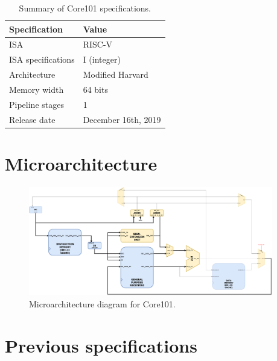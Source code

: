 \documentclass{article}
\begin{document}
\begin{table}[h]
    \centering
    \begin{tabular}{|l|l|}
        \hline
        \textbf{Specification}  &   \textbf{Value}      \\  \hline
        ISA                     &   RISC-V              \\  \hline
        ISA specifications      &   I (integer)         \\  \hline
        Architecture            &   Modified Harvard    \\  \hline
        Memory width            &   64 bits             \\  \hline
        Pipeline stages         &   1                   \\  \hline
        Release date            &   December 16th, 2019 \\  \hline
        
    \end{tabular}
    \caption{Summary of Core101 specifications.}
    \label{tab:specs0}
\end{table}

\section{Microarchitecture}

\begin{figure}[h]
    \centering
    \includegraphics[width=0.95\textwidth]{resources/core101.pdf}
    \caption{Microarchitecture diagram for Core101.}
    \label{fig:uarch}
\end{figure}

\appendix
\section{Previous specifications}
\end{document}
